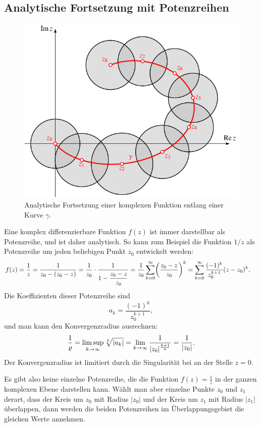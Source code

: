 \subsection{Analytische Fortsetzung mit Potenzreihen}
\begin{figure}
\centering
\includegraphics{chapters/080-funktionentheorie/images/forts.pdf}
\caption{Analytische Fortsetzung einer komplexen Funktion entlang einer
Kurve $\gamma$.
\label{komplex:fortsetzung}}
\end{figure}
Eine komplex differenzierbare Funktion $f(z)$ ist immer darstellbar als
Potenzreihe, und ist daher analytisch.
So kann zum Beispiel die Funktion $1/z$ als Potenzreihe um jeden
beliebigen Punkt $z_0$ entwickelt werden:
\begin{align}
f(z)
&=
\frac1z
=
\frac1{z_0-(z_0-z)}
=
\frac1{z_0}\cdot
\frac1{1-\displaystyle\frac{z_0-z\mathstrut}{z_0\mathstrut}}
=
\frac1{z_0}\sum_{k=0}^{\infty} \biggl(\frac{z_0-z\mathstrut}{z_0\mathstrut}\biggr)^k
=
\sum_{k=0}^{\infty} \frac{(-1)^k}{z_0^{k+1}} (z-z_0)^k,
\label{komplex:1durchreihe}
\end{align}
Die Koeffizienten dieser Potenzreihe sind
\[
a_k=\frac{(-1)^k}{z_0^{k+1}},
\]
und man kann den Konvergenzradius ausrechnen:
\[
\frac1{\varrho}
=
\limsup_{k\to\infty} \root{k}\of{|a_k|} = \lim_{k\to\infty}\frac1{|z_0|^{\frac{k+1}{k}}}
=
\frac1{|z_0|}.
\]
Der Konvergenzradius ist limitiert durch die Singularität bei an der Stelle
$z=0$.

Es gibt also keine einzelne Potenzreihe, die die Funktion $f(z)=\frac1z$ in der
ganzen komplexen Ebene darstellen kann.
Wählt man aber einzelne Punkte $z_0$ und $z_1$ derart, dass der Kreis
um $z_0$ mit Radius $|z_0|$ und der Kreis um $z_1$ mit Radius $|z_1|$
überlappen, dann werden die beiden Potenzreihen im Überlappungsgebiet
die gleichen Werte annehmen.

